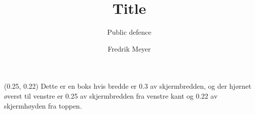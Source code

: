 \documentclass[UKenglish]{beamer}
\title{Title}
\subtitle{Public defence}
\author{Fredrik Meyer}
\begin{document}
\begin{frame}

    \begin{textblock}{0.3}(0.25, 0.22)
        Dette er en boks hvis bredde er \alert{0.3} av skjermbredden, og der hjørnet øverst til venstre er \alert{0.25} av skjermbredden fra venstre kant og \alert{0.22} av skjermhøyden fra toppen.
    \end{textblock}

\end{frame}
\end{document}
